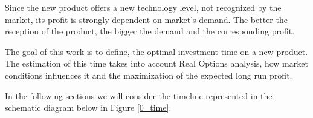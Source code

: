 Since the new product offers a new technology level, not recognized by the market, its profit is strongly dependent on market's demand. The better the reception of the product, the bigger the demand and the corresponding profit.


The goal of this work is to define,
the optimal investment time on a new product. The estimation of this time takes into account Real Options analysis, how market conditions influences it and 
the maximization of the expected long run profit.

In the following sections we will consider the timeline represented in the schematic diagram below in Figure \ref{0_time}.

%
%
%
%
%
%
%
%
%
%
%



